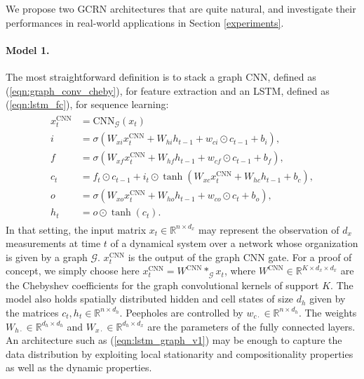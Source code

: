 \documentclass{article} %
\newcommand{\R}{\mathbb{R}}
\newcommand{\G}{\mathcal{G}}
\newcommand{\eqnref}[1]{(\ref{eqn:#1})}
\begin{document}
We propose two GCRN architectures that are quite natural, and investigate their
performances in real-world applications in Section \ref{experiments}.

\paragraph{Model 1.} The most straightforward definition is to stack a graph
CNN, defined as \eqnref{graph_conv_cheby}, for feature extraction and an LSTM,
defined as \eqnref{lstm_fc}, for sequence learning:
\begin{align} \label{eqn:lstm_graph_v1}
\begin{split}
	x_t^{\textrm{CNN}} &=  \textrm{CNN}_\G(x_t)\\
	i &= \sigma(W_{xi} x_t^{\textrm{CNN}} + W_{hi} h_{t-1}  +
	            w_{ci} \odot c_{t-1} + b_i), \\
	f &= \sigma(W_{xf} x_t^{\textrm{CNN}} + W_{hf} h_{t-1} + w_{cf} \odot c_{t-1} + b_f), \\
	c_t &= f_t \odot c_{t-1} + i_t \odot \tanh(W_{xc} x_t^{\textrm{CNN}} + W_{hc} h_{t-1} + b_c), \\
	o &= \sigma(W_{xo} x_t^{\textrm{CNN}} + W_{ho} h_{t-1} + w_{co} \odot c_t + b_o), \\
	h_t &= o \odot \tanh(c_t).
\end{split}
\end{align}
In that setting, the input matrix $x_t \in \R^{n \times d_x}$ may represent the
observation of $d_x$ measurements at time $t$ of a dynamical system over a
network whose organization is given by a graph $\G$. $x_t^{\textrm{CNN}}$ is the output of the graph CNN gate. For a proof of concept, we simply choose here $x_t^{\textrm{CNN}} = W^{\textrm{CNN}} \ast_\G x_t$, where $W^{\textrm{CNN}} \in \R^{K \times d_x \times d_x}$ are the Chebyshev coefficients  for the graph convolutional kernels of support $K$. The model also holds spatially distributed hidden and cell states of size $d_h$ given by the matrices $c_t, h_t \in \R^{n \times d_h}$. Peepholes are controlled by $w_{c\cdot} \in \R^{n \times d_h}$. The weights $W_{h\cdot} \in
\R^{ d_h \times d_h}$ and $W_{x\cdot} \in \R^{d_h \times d_x}$ are the parameters of the fully connected layers. An architecture such as \eqnref{lstm_graph_v1} may be enough to capture the data distribution by exploiting local stationarity and compositionality properties as well as the dynamic properties.
\end{document}
